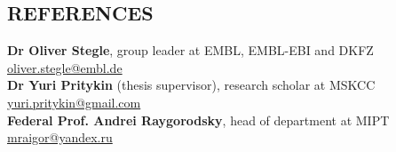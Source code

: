 \documentclass[11pt]{res}
\begin{document}
\begin{resume}
\section{REFERENCES} 
\vspace{0.1cm}
\textbf{Dr Oliver Stegle}, group leader at EMBL, EMBL-EBI and DKFZ
\hfill\href{mailto://oliver.stegle@embl.de}{oliver.stegle@embl.de}\\ 
\textbf{Dr Yuri Pritykin} (thesis supervisor), research scholar at MSKCC \hfill\href{mailto://yuri.pritykin@gmail.com}{yuri.pritykin@gmail.com}\\ 
\textbf{Federal Prof. Andrei Raygorodsky}, head of department at MIPT \hfill\href{mailto://mraigor@yandex.ru}{mraigor@yandex.ru}
\end{resume}
\end{document}
